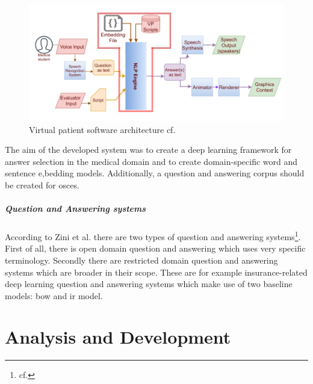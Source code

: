 \begin{figure}[htbp]
	\centering
	\includegraphics[width=1\textwidth]{images/vp_architecture.png}
	\caption{Virtual patient software architecture cf.\autocite{zini}}
	\label{vp_architecture}
\end{figure}

The aim of the developed system was to create a deep learning framework for answer selection in the medical domain and to create domain-specific word and sentence e,bedding models. Additionally, a question and answering corpus should be created for \ac{osce}s.

\paragraph{Question and Answering systems}
According to Zini et al. there are two types of question and answering systems\footnote{cf.\autocite{zini}}. First of all, there is open domain question and answering which uses very specific terminology. Secondly there are restricted domain question and answering systems which are broader in their scope. These are for example insurance-related deep learning question and answering systems which make use of two baseline models: \ac{bow} and \ac{ir} model. 


\chapter{Analysis and Development}

